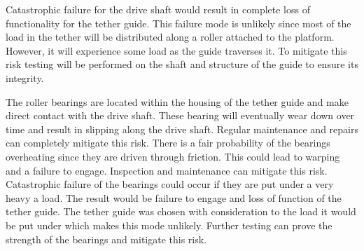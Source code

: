 \begin{table}[H]
\caption{\label{tab:tether_guide} Tether Guide Failure Modes \& Probabilities}
\centering

\end{table}

Catastrophic failure for the drive shaft would result in complete loss of functionality for the tether guide. This failure mode is unlikely since most of the load in the tether will be distributed along a roller attached to the platform. However, it will experience some load as the guide traverses it. To mitigate this risk testing will be performed on the shaft and structure of the guide to ensure its integrity.

The roller bearings are located within the housing of the tether guide and make direct contact with the drive shaft. These bearing will eventually wear down over time and result in slipping along the drive shaft. Regular maintenance and repairs can completely mitigate this risk. There is a fair probability of the bearings overheating since they are driven through friction. This could lead to warping and a failure to engage. Inspection and maintenance can mitigate this risk. Catastrophic failure of the bearings could occur if they are put under a very heavy a load. The result would be failure to engage and loss of function of the tether guide. The tether guide was chosen with consideration to the load it would be put under which makes this mode unlikely. Further testing can prove the strength of the bearings and mitigate this risk.

